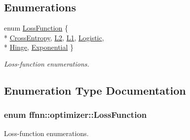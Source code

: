 \subsection*{Enumerations}
\begin{DoxyCompactItemize}
\item 
enum \hyperlink{namespaceffnn_1_1optimizer_a9a8fe8c3d1a3a20231195d767fbf65fa}{Loss\-Function} \{ \\*
\hyperlink{namespaceffnn_1_1optimizer_a9a8fe8c3d1a3a20231195d767fbf65faaa0598d50e766937658e2677d13e574f8}{Cross\-Entropy}, 
\hyperlink{namespaceffnn_1_1optimizer_a9a8fe8c3d1a3a20231195d767fbf65faaeb6fd7c27abcc8aaf97be3622c44ce4b}{L2}, 
\hyperlink{namespaceffnn_1_1optimizer_a9a8fe8c3d1a3a20231195d767fbf65faadb600e39bd84006159541fa0cd788cc9}{L1}, 
\hyperlink{namespaceffnn_1_1optimizer_a9a8fe8c3d1a3a20231195d767fbf65faafda22da78e671e6ea3845179b756aed6}{Logistic}, 
\\*
\hyperlink{namespaceffnn_1_1optimizer_a9a8fe8c3d1a3a20231195d767fbf65faa9a2f9c7afed39162a2b1c13936e8b266}{Hinge}, 
\hyperlink{namespaceffnn_1_1optimizer_a9a8fe8c3d1a3a20231195d767fbf65faa912c1f6b00a2fbbae2d62b7f791a9ff4}{Exponential}
 \}
\begin{DoxyCompactList}\small\item\em Loss-\/function enumerations. \end{DoxyCompactList}\end{DoxyCompactItemize}


\subsection{Enumeration Type Documentation}
\hypertarget{namespaceffnn_1_1optimizer_a9a8fe8c3d1a3a20231195d767fbf65fa}{
\subsubsection[{Loss\-Function}]{\setlength{\rightskip}{0pt plus 5cm}enum {\bf ffnn\-::optimizer\-::\-Loss\-Function}}}\label{namespaceffnn_1_1optimizer_a9a8fe8c3d1a3a20231195d767fbf65fa}


Loss-\/function enumerations. 

